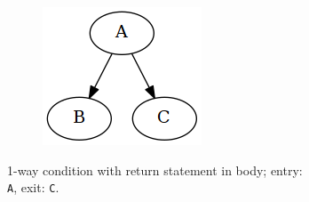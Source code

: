 \begin{figure}[htbp]
	\qquad
	\begin{subfigure}[ht]{0.30\textwidth}
		\centering
		\begin{subfigure}[ht]{0.45\textwidth}
			
		\end{subfigure}
		\begin{subfigure}[ht]{0.50\textwidth}
			\includegraphics[width=\textwidth]{inc/primitives/if_return.png}
		\end{subfigure}
		\caption{1-way condition with return statement in body; entry: \texttt{A}, exit: \texttt{C}.}
		\label{fig:if_return_graph_representation}
	\end{subfigure}
	\qquad
	\begin{subfigure}[ht]{0.32\textwidth}
		\centering
		\begin{subfigure}[ht]{0.45\textwidth}
			
		\end{subfigure}
		\begin{subfigure}[ht]{0.50\textwidth}

\end{subfigure}
\end{subfigure}
\end{figure}

